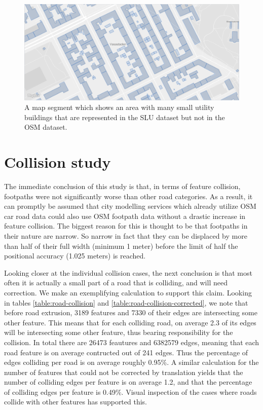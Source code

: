 \documentclass{kththesis}
\begin{document}
\begin{figure}[H]
    \centering
    \includegraphics[width=\textwidth,height=0.5\textheight,keepaspectratio]{img_map_utility_buildings}
    \caption{A map segment which shows an area with many small utility buildings that are represented in the SLU dataset but not in the OSM dataset.}
    \label{fig:osm-slu-map-utility-buildings}
\end{figure}



\section{Collision study}

The immediate conclusion of this study is that, in terms of feature collision, footpaths were not significantly worse than other road categories.
As a result, it can promptly be assumed that city modelling services which already utilize OSM car road data could also use OSM footpath data without a drastic increase in feature collision.
The biggest reason for this is thought to be that footpaths in their nature are narrow.
So narrow in fact that they can be displaced by more than half of their full width (minimum 1 meter) before the limit of half the positional accuracy (1.025 meters) is reached.

Looking closer at the individual collision cases, the next conclusion is that most often it is actually a small part of a road that is colliding, and will need correction.
We make an exemplifying calculation to support this claim.
Looking in tables \ref{table:road-collision} and \ref{table:road-collision-corrected}, we note that before road extrusion, 3189 features and 7330 of their edges are intersecting some other feature.
This means that for each colliding road, on average 2.3 of its edges will be intersecting some other feature, thus bearing responsibility for the collision.
In total there are 26473 feautures and 6382579 edges, meaning that each road feature is on average contructed out of 241 edges.
Thus the percentage of edges colliding per road is on average roughly 0.95\%.
A similar calculation for the number of features that could not be corrected by translation yields that the number of colliding edges per feature is on average 1.2, and that the percentage of colliding edges per feature is 0.49\%.
Visual inspection of the cases where roads collide with other features has supported this.
\end{document}
